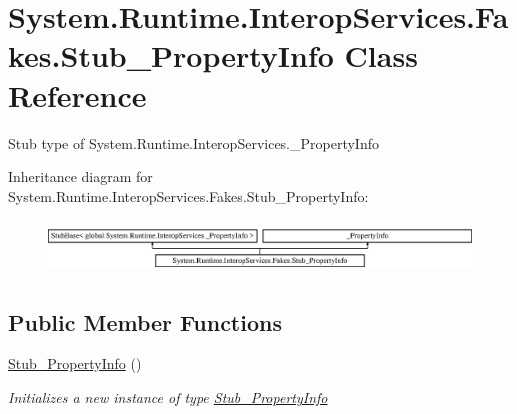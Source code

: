 \hypertarget{class_system_1_1_runtime_1_1_interop_services_1_1_fakes_1_1_stub___property_info}{\section{System.\-Runtime.\-Interop\-Services.\-Fakes.\-Stub\-\_\-\-Property\-Info Class Reference}
\label{class_system_1_1_runtime_1_1_interop_services_1_1_fakes_1_1_stub___property_info}
}


Stub type of System.\-Runtime.\-Interop\-Services.\-\_\-\-Property\-Info 


Inheritance diagram for System.\-Runtime.\-Interop\-Services.\-Fakes.\-Stub\-\_\-\-Property\-Info\-:\begin{figure}[H]
\begin{center}
\leavevmode
\includegraphics[height=1.410579cm]{class_system_1_1_runtime_1_1_interop_services_1_1_fakes_1_1_stub___property_info}
\end{center}
\end{figure}
\subsection*{Public Member Functions}
\begin{DoxyCompactItemize}
\item 
\hyperlink{class_system_1_1_runtime_1_1_interop_services_1_1_fakes_1_1_stub___property_info_a1aae8af2aea184f3f90a895666c9b28f}{Stub\-\_\-\-Property\-Info} ()
\begin{DoxyCompactList}\small\item\em Initializes a new instance of type \hyperlink{class_system_1_1_runtime_1_1_interop_services_1_1_fakes_1_1_stub___property_info}{Stub\-\_\-\-Property\-Info}\end{DoxyCompactList}\end{DoxyCompactItemize}
